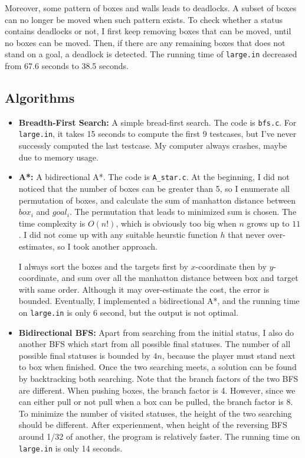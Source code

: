 \documentclass[12pt,a4paper]{article}
\begin{document}
    Moreover, some pattern of boxes and walls leads to deadlocks. A subset of boxes can no longer be moved when such pattern exists. To check whether a status contains deadlocks or not, I first keep removing boxes that can be moved, until no boxes can be moved. Then, if there are any remaining boxes that does not stand on a goal, a deadlock is detected. The running time of \texttt{large.in} decreased from 67.6 seconds to 38.5 seconds.

    \subsection{Algorithms}
    \begin{itemize}
        \item \textbf{Breadth-First Search: }
            A simple bread-first search. The code is \texttt{bfs.c}. For \texttt{large.in}, it takes 15 seconds to compute the first 9 testcases, but I've never successly computed the last testcase. My computer always crashes, maybe due to memory usage.
        \item \textbf{A*: }
            A bidirectional A*. The code is \texttt{A\_star.c}. At the beginning, I did not noticed that the number of boxes can be greater than 5, so I enumerate all permutation of boxes, and calculate the sum of manhatton distance between $box_i$ and $goal_i$. The permutation that leads to minimized sum is chosen. The time complexity is $O(n!)$, which is obviously too big when $n$ grows up to $11$. I did not come up with any suitable heurstic function $h$ that never over-estimates, so I took another approach. 

            I always sort the boxes and the targets first by $x$-coordinate then by $y$-coordinate, and sum over all the manhatton distance between box and target with same order. Although it may over-estimate the cost, the error is bounded. Eventually, I implemented a bidirectional A*, and the running time on \texttt{large.in} is only 6 second, but the output is not optimal.

        \item \textbf{Bidirectional BFS: }
            Apart from searching from the initial status, I also do another BFS which start from all possible final statuses. The number of all possible final statuses is bounded by $4n$, because the player must stand next to box when finished. Once the two searching meets, a solution can be found by backtracking both searching. Note that the branch factors of the two BFS are different. When pushing boxes, the branch factor is 4. However, since we can either pull or not pull when a box can be pulled, the branch factor is 8. To minimize the number of visited statuses, the height of the two searching should be different. After experienment, when height of the reversing BFS around 1/32 of another, the program is relatively faster. The running time on \texttt{large.in} is only 14 seconds.
    \end{itemize}
\end{document}
